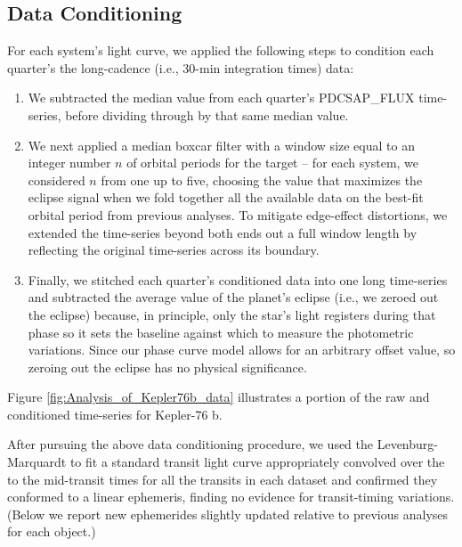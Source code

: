 \documentclass[manuscript]{aastex}
\begin{document}
\subsection{Data Conditioning}
For each system's light curve, we applied the following steps to condition each quarter's the long-cadence (i.e., 30-min integration times) data:
\begin{enumerate}
\item We subtracted the median value from each quarter's PDCSAP\_FLUX time-series, before dividing through by that same median value.
\item We next applied a median boxcar filter with a window size equal to an integer number $n$ of orbital periods for the target -- for each system, we considered $n$ from one up to five, choosing the value that maximizes the eclipse signal when we fold together all the available data on the best-fit orbital period from previous analyses. To mitigate edge-effect distortions, we extended the time-series beyond both ends out a full window length by reflecting the original time-series across its boundary.
\item Finally, we stitched each quarter's conditioned data into one long time-series and subtracted the average value of the planet's eclipse (i.e., we zeroed out the eclipse) because, in principle, only the star's light registers during that phase so it sets the baseline against which to measure the photometric variations. Since our phase curve model allows for an arbitrary offset value, so zeroing out the eclipse has no physical significance.
\end{enumerate}
Figure \ref{fig:Analysis_of_Kepler76b_data} illustrates a portion of the raw and conditioned time-series for Kepler-76 b. 

After pursuing the above data conditioning procedure, we used the Levenburg-Marquardt to fit a standard transit light curve \citep{2002ApJ...580L.171M} appropriately convolved over the to the mid-transit times for all the transits in each dataset and confirmed they conformed to a linear ephemeris, finding no evidence for transit-timing variations. (Below we report new ephemerides slightly updated relative to previous analyses for each object.) 
\end{document}
